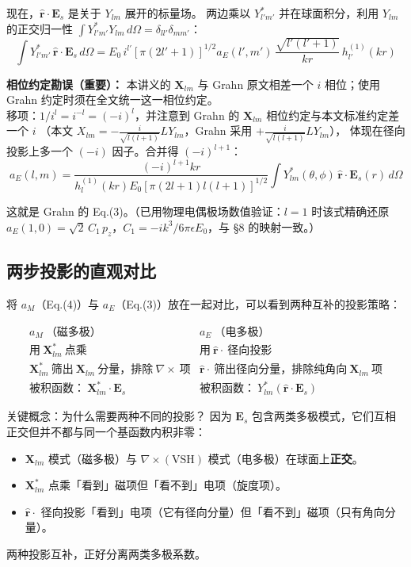 现在，$\hat{\mathbf{r}}\cdot\mathbf{E}_s$ 是关于 $Y_{lm}$ 展开的标量场。
两边乘以 $Y_{l'm'}^*$ 并在球面积分，利用 $Y_{lm}$ 的正交归一性
$\int Y_{l'm'}^*Y_{lm}\,d\Omega = \delta_{ll'}\delta_{mm'}$：
$$
\int Y_{l'm'}^*\,\hat{\mathbf{r}}\cdot\mathbf{E}_s\,d\Omega
= E_0\,i^{l'}[\pi(2l'+1)]^{1/2}
  a_E(l',m')\,\frac{\sqrt{l'(l'+1)}}{kr}\,h_{l'}^{(1)}(kr)
$$

\textbf{相位约定勘误（重要）：} 本讲义的 $\mathbf{X}_{lm}$ 与 Grahn 原文相差一个 $i$ 相位；使用 Grahn 约定时须在全文统一这一相位约定。\\
移项：$1/i^l = i^{-l} = (-i)^l$，并注意到 Grahn 的 $\mathbf{X}_{lm}$ 相位约定与本文标准约定差一个 $i$
（本文 $X_{lm}=-\frac{i}{\sqrt{l(l+1)}}LY_{lm}$，Grahn 采用 $+\frac{i}{\sqrt{l(l+1)}}LY_{lm}$），
体现在径向投影上多一个 $(-i)$ 因子。合并得 $(-i)^{l+1}$：
\begin{equation}
  \boxed{\;
    a_E(l,m) = \frac{(-i)^{l+1}kr}{h_l^{(1)}(kr)E_0[\pi(2l+1)l(l+1)]^{1/2}}
    \int Y_{lm}^*(\theta,\phi)\,\hat{\mathbf{r}}\cdot\mathbf{E}_s(r)\,d\Omega
    \;}
  \label{eq:aE_proj}
\end{equation}

这就是 Grahn 的 Eq.(3)。（已用物理电偶极场数值验证：$l=1$ 时该式精确还原
$a_E(1,0)=\sqrt{2}\,C_1\,p_z$，$C_1=-ik^3/6\pi\epsilon E_0$，与 \S8 的映射一致。）

\subsection{两步投影的直观对比}

将 $a_M$（Eq.(4)）与 $a_E$（Eq.(3)）放在一起对比，可以看到两种互补的投影策略：

\[
\begin{array}{c|c}
a_M\ \text{（磁多极）} & a_E\ \text{（电多极）} \\ \hline
\text{用}\ \mathbf{X}_{lm}^*\ \text{点乘} & \text{用}\ \hat{\mathbf{r}}\cdot\ \text{径向投影} \\
\mathbf{X}_{lm}^*\ \text{筛出}\ \mathbf{X}_{lm}\ \text{分量，排除}\ \nabla\times\ \text{项} & \hat{\mathbf{r}}\cdot\ \text{筛出径向分量，排除纯角向}\ \mathbf{X}_{lm}\ \text{项} \\
\text{被积函数：}\ \mathbf{X}_{lm}^*\cdot\mathbf{E}_s & \text{被积函数：}\ Y_{lm}^*(\hat{\mathbf{r}}\cdot\mathbf{E}_s)
\end{array}
\]

\begin{stepbox}{关键概念：为什么需要两种不同的投影？}
因为 $\mathbf{E}_s$ 包含两类多极模式，它们互相正交但并不都与同一个基函数内积非零：
\begin{itemize}
  \item $\mathbf{X}_{lm}$ 模式（磁多极）与 $\nabla\times(\text{VSH})$ 模式（电多极）在球面上\textbf{正交}。
  \item $\mathbf{X}_{lm}^*$ 点乘「看到」磁项但「看不到」电项（旋度项）。
  \item $\hat{\mathbf{r}}\cdot$ 径向投影「看到」电项（它有径向分量）但「看不到」磁项（只有角向分量）。
\end{itemize}
两种投影互补，正好分离两类多极系数。
\end{stepbox}

